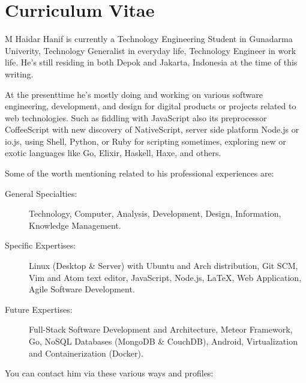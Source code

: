 \cleardoublepage
{}

\thispagestyle{empty}

\chapter*{Curriculum Vitae}
\label{chap:cv}

\begin{figure}[htb]
    \centering
    \label{fig:cv:mhaidarhanif}
\end{figure}

M Haidar Hanif is currently a Technology Engineering Student in Gunadarma Univerity, Technology Generalist in everyday life, Technology Engineer in work life.
He's still residing in both Depok and Jakarta, Indonesia at the time of this writing.

At the presenttime he's mostly doing and working on various software engineering, development, and design for digital products or projects related to web technologies.
Such as fiddling with JavaScript also its preprocessor CoffeeScript with new discovery of NativeScript, server side platform Node.js or io.js, using Shell, Python, or Ruby for scripting sometimes, exploring new or exotic languages like Go, Elixir, Haskell, Haxe, and  others.

\noindent Some of the worth mentioning related to his professional experiences are:

\begin{description}
  \item [General Specialties:] Technology, Computer, Analysis, Development, Design, Information, Knowledge Management.
  \item [Specific Expertises:] Linux (Desktop \& Server) with Ubuntu and Arch distribution, Git SCM, Vim and Atom text editor, JavaScript, Node.js, LaTeX, Web Application, Agile Software Development.
  \item [Future Expertises:] Full-Stack Software Development and Architecture, Meteor Framework, Go, NoSQL Databases (MongoDB \& CouchDB), Android, Virtualization and Containerization (Docker).
\end{description}

\clearpage

\noindent You can contact him via these various ways and profiles:

